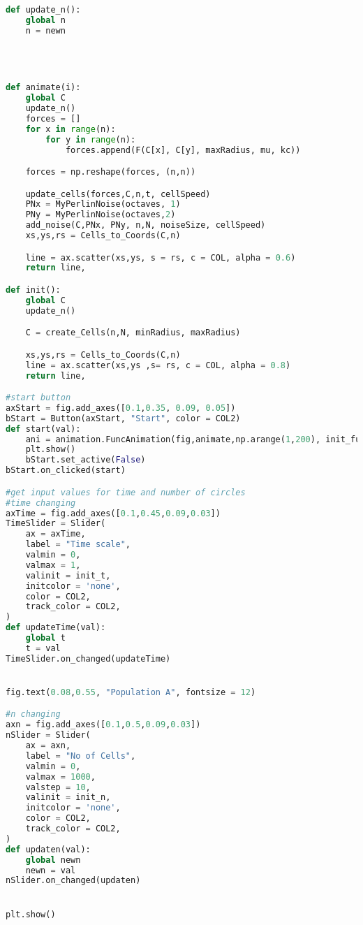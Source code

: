 \documentclass[11pt,a4paper]{article}
\begin{document}
\begin{lstlisting}[language=Python, mathescape=true]
def update_n():
    global n
    n = newn




def animate(i):
    global C
    update_n()
    forces = []
    for x in range(n):
        for y in range(n):
            forces.append(F(C[x], C[y], maxRadius, mu, kc))

    forces = np.reshape(forces, (n,n))

    update_cells(forces,C,n,t, cellSpeed)
    PNx = MyPerlinNoise(octaves, 1)
    PNy = MyPerlinNoise(octaves,2)
    add_noise(C,PNx, PNy, n,N, noiseSize, cellSpeed)
    xs,ys,rs = Cells_to_Coords(C,n)

    line = ax.scatter(xs,ys, s = rs, c = COL, alpha = 0.6)
    return line,

def init():
    global C
    update_n()

    C = create_Cells(n,N, minRadius, maxRadius)

    xs,ys,rs = Cells_to_Coords(C,n)
    line = ax.scatter(xs,ys ,s= rs, c = COL, alpha = 0.8)
    return line,

#start button
axStart = fig.add_axes([0.1,0.35, 0.09, 0.05])
bStart = Button(axStart, "Start", color = COL2)
def start(val):
    ani = animation.FuncAnimation(fig,animate,np.arange(1,200), init_func = init, interval = 1000*t, blit = True)
    plt.show()  
    bStart.set_active(False)
bStart.on_clicked(start)

#get input values for time and number of circles
#time changing
axTime = fig.add_axes([0.1,0.45,0.09,0.03])
TimeSlider = Slider(
    ax = axTime,
    label = "Time scale",
    valmin = 0,
    valmax = 1,
    valinit = init_t,
    initcolor = 'none',
    color = COL2,
    track_color = COL2,
)
def updateTime(val):
    global t
    t = val
TimeSlider.on_changed(updateTime)


fig.text(0.08,0.55, "Population A", fontsize = 12)

#n changing
axn = fig.add_axes([0.1,0.5,0.09,0.03])
nSlider = Slider(
    ax = axn,
    label = "No of Cells",
    valmin = 0,
    valmax = 1000,
    valstep = 10,
    valinit = init_n,
    initcolor = 'none',
    color = COL2,
    track_color = COL2,
)
def updaten(val):
    global newn
    newn = val
nSlider.on_changed(updaten)


plt.show()
\end{lstlisting}
\end{document}
